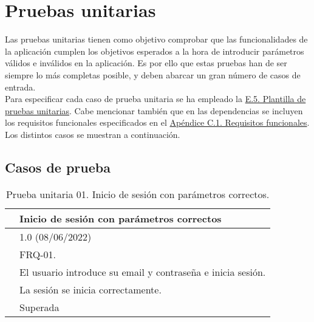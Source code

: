 \section{Pruebas unitarias}

Las pruebas unitarias \cite{pruebaunitaria} tienen como objetivo comprobar que las funcionalidades de la aplicación cumplen los objetivos esperados a la hora de introducir parámetros válidos e inválidos en la aplicación. Es por ello que estas pruebas han de ser siempre lo más completas posible, y deben abarcar un gran número de casos de entrada.
\\

Para especificar cada caso de prueba unitaria se ha empleado la \hyperref[enlacePUX]{E.5. Plantilla de pruebas unitarias}. Cabe mencionar también que en las dependencias se incluyen los requisitos funcionales especificados en el \hyperref[APRequisitosFuncionales]{Apéndice C.1. Requisitos funcionales}. Los distintos casos se muestran a continuación.

\subsection{Casos de prueba}

\begin{table}[H]
\begin{center}
\begin{tabular}{|p{3cm}|p{10cm}|} \hline
\centering {\bf PU-01} & Inicio de sesión con parámetros correctos  \\ \hline\hline
\centering {\bf Versión} & 1.0 (08/06/2022) \\ \hline
\centering {\bf Dependencias} &  FRQ-01. \\ \hline
\centering {\bf Descripción} &  El usuario introduce su email y contraseña e inicia sesión. \\ \hline
\centering {\bf Criterio de aceptación} & La sesión se inicia correctamente. \\ \hline
\centering {\bf Estado} & Superada \\ \hline
\end{tabular}
\caption{Prueba unitaria 01. Inicio de sesión con parámetros correctos.}
\label{enlacePU1}
\end{center}
\end{table}

